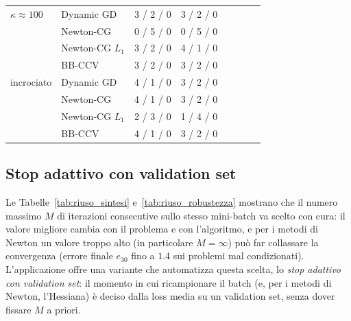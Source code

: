 \begin{table}[H]
\begin{tabular}{@{}llrrr|rrr@{}}
$\kappa\approx100$ & Dynamic GD & 3 / 2 / 0 & 3 / 2 / 0\\

 & Newton-CG & 0 / 5 / 0 & 0 / 5 / 0\\

 & Newton-CG $L_1$ & 3 / 2 / 0 & 4 / 1 / 0\\

 & BB-CCV & 3 / 2 / 0 & 3 / 2 / 0\\

\midrule

incrociato & Dynamic GD & 4 / 1 / 0 & 3 / 2 / 0\\

 & Newton-CG & 4 / 1 / 0 & 3 / 2 / 0\\

 & Newton-CG $L_1$ & 2 / 3 / 0 & 1 / 4 / 0\\

 & BB-CCV & 4 / 1 / 0 & 3 / 2 / 0\\

\bottomrule

\end{tabular}

\end{table}





\subsection{Stop adattivo con validation set}\label{app:riuso-validation}

Le Tabelle~\ref{tab:riuso_sintesi} e~\ref{tab:riuso_robustezza} mostrano che
il numero massimo $M$ di iterazioni consecutive sullo stesso mini-batch va
scelto con cura: il valore migliore cambia con il problema e con
l'algoritmo, e per i metodi di Newton un valore troppo alto (in particolare
$M=\infty$) può far collassare la convergenza (errore finale $e_{30}$ fino a
$1.4$ sui problemi mal condizionati). L'applicazione offre una variante che
automatizza questa scelta, lo \emph{stop adattivo con validation set}: il
momento in cui ricampionare il batch (e, per i metodi di Newton, l'Hessiana)
è deciso dalla loss media su un validation set, senza dover fissare $M$ a
priori.

